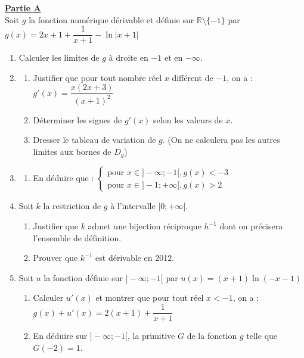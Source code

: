 \documentclass[12pt,a4paper]{article}
\begin{document}
\noindent \underline{\textbf{Partie A}} \\
Soit $g$ la fonction numérique dérivable et définie sur $\mathbb{R} \setminus \{-1\}$ par $g(x) = 2x + 1 + \dfrac{1}{x+1} - \ln |x + 1|$
\begin{enumerate}
    \item Calculer les limites de $g$ à droite en $-1$ et en $-\infty$.
    \item \begin{enumerate}
        \item Justifier que pour tout nombre réel $x$ différent de $-1$, on a : $g'(x) = \dfrac{x(2x+3)}{(x+1)^2}$
        \item Déterminer les signes de $g'(x)$ selon les valeurs de $x$.
        \item Dresser le tableau de variation de $g$. (On ne calculera pas les autres limites aux bornes de $D_g$)
    \end{enumerate}
    \item \begin{enumerate}
        \item En déduire que : $\begin{cases} \text{pour } x \in ]-\infty; -1[, g(x) < -3 \\ \text{pour } x \in ]-1; +\infty[, g(x) > 2 \end{cases}$
    \end{enumerate}
    \item Soit $k$ la restriction de $g$ à l'intervalle $]0; +\infty[$.
    \begin{enumerate}
        \item Justifier que $k$ admet une bijection réciproque $h^{-1}$ dont on précisera l'ensemble de définition.
        \item Prouver que $k^{-1}$ est dérivable en 2012.
    \end{enumerate}
    \item Soit $u$ la fonction définie sur $]-\infty; -1[$ par $u(x) = (x+1)\ln(-x-1)$
    \begin{enumerate}
        \item Calculer $u'(x)$ et montrer que pour tout réel $x < -1$, on a : $g(x) + u'(x) = 2(x+1) + \dfrac{1}{x+1}$
        \item En déduire sur $]-\infty; -1[$, la primitive $G$ de la fonction $g$ telle que $G(-2) = 1$.
    \end{enumerate}
\end{enumerate}

\vspace{0.5cm}
\end{document}
